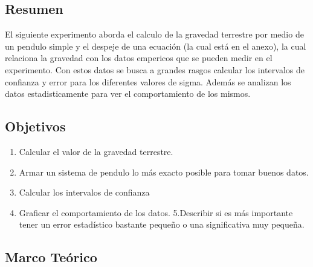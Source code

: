 \documentclass[
]{article}
\providecommand{\tightlist}{%
  \setlength{\itemsep}{0pt}\setlength{\parskip}{0pt}}
\begin{document}
{\parindent=0pt \hrulefill} 
\vspace{1mm}

\subsection{\texorpdfstring{\textbf{Resumen }}{Resumen }}\label{resumen}

El siguiente experimento aborda el calculo de la gravedad terrestre por
medio de un pendulo simple y el despeje de una ecuación (la cual está en
el anexo), la cual relaciona la gravedad con los datos empericos que se
pueden medir en el experimento. Con estos datos se busca a grandes
rasgos calcular los intervalos de confianza y error para los diferentes
valores de sigma. Además se analizan los datos estadisticamente para ver
el comportamiento de los mismos.

\subsection{\texorpdfstring{\textbf{Objetivos
}}{Objetivos }}\label{objetivos}

\begin{enumerate}
\def\labelenumi{\arabic{enumi}.}
\tightlist
\item
  Calcular el valor de la gravedad terrestre.
\item
  Armar un sistema de pendulo lo más exacto posible para tomar buenos
  datos.
\item
  Calcular los intervalos de confianza
\item
  Graficar el comportamiento de los datos. 5.Describir si es más
  importante tener un error estadístico bastante pequeño o una
  significativa muy pequeña.
\end{enumerate}

\subsection{\texorpdfstring{\textbf{Marco Teórico
}}{Marco Teórico }}\label{marco-teuxf3rico}
\end{document}
